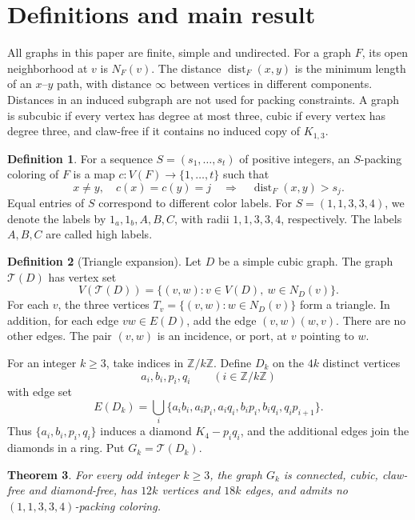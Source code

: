 \documentclass[11pt,a4paper]{article}
\newtheorem{theorem}{Theorem}[section]
\theoremstyle{definition}
\newtheorem{definition}[theorem]{Definition}
\theoremstyle{remark}
\newcommand{\V}{V}
\newcommand{\E}{E}
\newcommand{\NN}{N}
\newcommand{\Exp}{\mathcal{T}}
\newcommand{\palette}{(1,1,3,3,4)}
\DeclareMathOperator{\dist}{dist}
\begin{document}
\section{Definitions and main result}

All graphs in this paper are finite, simple and undirected. For a
graph \(F\), its open neighborhood at \(v\) is \(\NN_F(v)\).
The distance \(\dist_F(x,y)\) is the minimum length of an \(x\)--\(y\)
path, with distance \(\infty\) between vertices in different components.
Distances in an induced subgraph are not used for packing
constraints. A graph is subcubic if every vertex has degree at most
three, cubic if every vertex has degree three, and claw-free if it
contains no induced copy of \(K_{1,3}\).

\begin{definition}
For a sequence \(S=(s_1,\ldots,s_t)\) of positive integers, an
\(S\)-packing coloring of \(F\) is a map
\(c:\V(F)\longrightarrow\{1,\ldots,t\}\) such that
\[
 x\ne y,\quad c(x)=c(y)=j
 \quad\Longrightarrow\quad \dist_F(x,y)>s_j.
\]
Equal entries of \(S\) correspond to different color labels.
For \(S=\palette\), we denote the labels by
\(1_a,1_b,A,B,C\), with radii \(1,1,3,3,4\), respectively.
The labels \(A,B,C\) are called high labels.
\end{definition}

\begin{definition}[Triangle expansion]\label{def:expansion}
Let \(D\) be a simple cubic graph. The graph \(\Exp(D)\) has vertex set
\[
 \V(\Exp(D))=\{(v,w):v\in\V(D),\ w\in\NN_D(v)\}.
\]
For each \(v\), the three vertices
\(T_v=\{(v,w):w\in\NN_D(v)\}\) form a triangle. In addition, for
each edge \(vw\in\E(D)\), add the edge \((v,w)(w,v)\).
There are no other edges. The pair \((v,w)\) is an incidence, or port,
at \(v\) pointing to \(w\).
\end{definition}

For an integer \(k\geq3\), take indices in \(\mathbb Z/k\mathbb Z\).
Define \(D_k\) on the \(4k\) distinct vertices
\[
 a_i,b_i,p_i,q_i\qquad (i\in\mathbb Z/k\mathbb Z)
\]
with edge set
\begin{equation}\label{eq:coreedges}
 \E(D_k)=\bigcup_i
 \{a_ib_i,a_ip_i,a_iq_i,b_ip_i,b_iq_i,q_ip_{i+1}\}.
\end{equation}
Thus \(\{a_i,b_i,p_i,q_i\}\) induces a diamond \(K_4-p_iq_i\),
and the additional edges join the diamonds in a ring. Put
\(G_k=\Exp(D_k)\).

\begin{theorem}\label{thm:main}
For every odd integer \(k\geq3\), the graph \(G_k\) is connected,
cubic, claw-free and diamond-free, has \(12k\) vertices and \(18k\)
edges, and admits no \(\palette\)-packing coloring.
\end{theorem}
\end{document}
